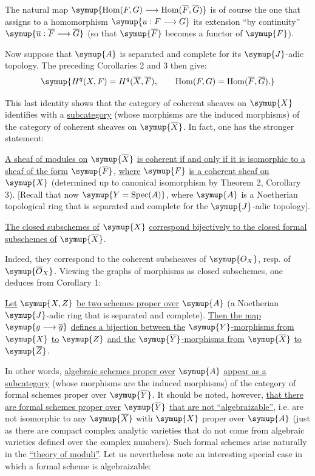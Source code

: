 The natural map
$\symup{\operatorname{Hom}(F,G)\longrightarrow
\operatorname{Hom}(\overline F,\overline G)}$ is of course the one that assigns
to a homomorphism $\symup{u:F\longrightarrow G}$ its extension “by continuity”
$\symup{\overline u:\overline F\longrightarrow\overline G}$ (so that
$\symup{\overline F}$ becomes a functor of $\symup{F}$).

Now suppose that $\symup{A}$ is separated and complete for its $\symup{J}$-adic topology. The
preceding Corollaries 2 and 3 then give:
\[
  \symup{H^{q}(X,F)=H^{q}(\overline X,\overline F),
  \qquad
  \operatorname{Hom}(F,G)
  =\operatorname{Hom}(\overline F,\overline G).}
\]

This last identity shows that the category of coherent sheaves on $\symup{X}$
identifies with a \uline{subcategory} (whose morphisms are the induced
morphisms) of the category of coherent sheaves on $\symup{\overline X}$. In fact, one
has the stronger statement:

 \uline{A sheaf of modules on} $\symup{\overline X}$ \uline{is coherent if and only
if it is isomorphic to a sheaf of the form} $\symup{\overline F}$, \uline{where} $\symup{F}$ \uline{is a
coherent sheaf on} $\symup{X}$ (determined up to canonical isomorphism by Theorem 2,
Corollary 3). [Recall that now $\symup{Y=\operatorname{Spec}(A)}$, where $\symup{A}$ is a
Noetherian topological ring that is separated and complete for the $\symup{J}$-adic
topology].

 \uline{The closed subschemes of} $\symup{X}$ \uline{correspond bijectively to
the closed formal subschemes of} $\symup{\overline X}$.

Indeed, they correspond to the coherent subsheaves of $\symup{O_X}$, resp.
of $\symup{\overline{O}_X}$. Viewing the graphs of morphisms as closed subschemes,
one deduces from Corollary 1:

 \uline{Let} $\symup{X,Z}$ \uline{be two schemes proper over} $\symup{A}$ (a Noetherian
$\symup{J}$-adic ring that is separated and complete). \uline{Then the map}
$\symup{g\longrightarrow\overline g}$ \uline{defines a bijection between the} $\symup{Y}$\uline{-morphisms from}
$\symup{X}$ \uline{to} $\symup{Z}$ \uline{and the} $\symup{\overline Y}$\uline{-morphisms from} $\symup{\overline X}$ \uline{to}
$\symup{\overline Z}$.

In other words, \uline{algebraic schemes proper over} $\symup{A}$ \uline{appear as a
subcategory} (whose morphisms are the induced morphisms) of the category
of formal schemes proper over $\symup{\overline Y}$. It should be noted, however, \uline{that
there are formal schemes proper over} $\symup{\overline Y}$ \uline{that are not
“algebraizable”}, i.e. are not isomorphic to any $\symup{\overline X}$ with $\symup{X}$ proper
over $\symup{A}$ (just as there are compact complex analytic varieties that do not
come from algebraic varieties defined over the complex numbers). Such formal
schemes arise naturally in the \uline{“theory of moduli”}. Let us nevertheless note
an interesting special case in which a formal scheme is algebraizable:

